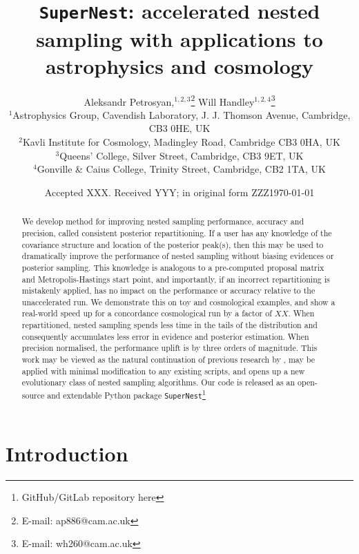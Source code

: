 \documentclass[draft,usenatbib]{mnras}
\date{Accepted XXX. Received YYY; in original form ZZZ}
\date{\today}
\title{}
\begin{document}
\tableofcontents

\begin{abstract}
    We develop method for improving nested sampling performance, accuracy and precision, called consistent posterior repartitioning. If a user has any knowledge of the covariance structure and location of the posterior peak(s), then this may be used to dramatically improve the performance of nested sampling without biasing evidences or posterior sampling.
    This knowledge is analogous to a pre-computed proposal matrix and Metropolis-Hastings start point, and importantly, if an incorrect repartitioning is mistakenly applied, has no impact on the performance or accuracy relative to the unaccelerated run.
    We demonstrate this on toy and cosmological examples, and show a real-world speed up for a concordance cosmological run by a factor of \(XX\). When repartitioned, nested sampling spends less time in the tails of the distribution and consequently accumulates less error in evidence and posterior estimation. When precision normalised, the performance uplift is by three orders of magnitude.
    This work may be viewed as the natural continuation of previous research by \citet{chen-ferroz-hobson}, may be applied with minimal modification to any existing scripts, and opens up a new evolutionary class of nested sampling algorithms.
    Our code is released as an open-source and extendable Python package \texttt{SuperNest}\footnote{GitHub/GitLab repository here}
\end{abstract}

\title[\texttt{SuperNest}]{\texttt{SuperNest}: accelerated nested sampling with applications to astrophysics and cosmology}

\author[Petrosyan \& Handley]{
    Aleksandr Petrosyan,$^{1,2,3}$\thanks{E-mail: ap886@cam.ac.uk}
    Will Handley$^{1,2,4}$\thanks{E-mail: wh260@cam.ac.uk}
\\
$^{1}$Astrophysics Group, Cavendish Laboratory, J. J. Thomson Avenue, Cambridge, CB3 0HE, UK\\
$^{2}$Kavli Institute for Cosmology, Madingley Road, Cambridge CB3 0HA, UK \\
$^{3}$Queens' College, Silver Street, Cambridge, CB3 9ET, UK \\
$^{4}$Gonville \& Caius College, Trinity Street, Cambridge, CB2 1TA, UK
}

\section{Introduction}
\label{sec:org0ed8441}
\end{document}
